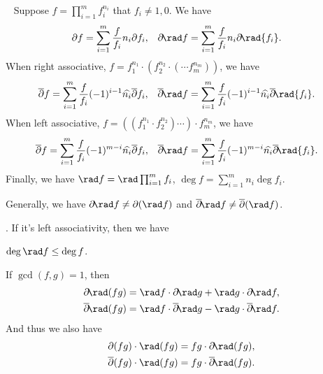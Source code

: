 \begin{proposition}~\label{prop:operator-are-separable}
	Suppose $f = \prod_{i=1}^{m}f_{i}^{n_i}$ that $f_i\ne 1, 0$.  We have
	\begin{align*}
		\partial f &= \sum_{i=1}^{m}\frac{f}{f_i}n_i\partial{f_i}, & \partial\!\rad f &= \sum_{i=1}^{m}\frac{f}{f_i}n_i\partial\!\rad{f_i}.
	\end{align*}
	When right associative, $f = f_1^{n_1}\cdot (f_2^{n_2}\cdot (\cdots f_m^{n_m}))$, we have
	\begin{align*}
		\overline{\partial}f &= \sum_{i=1}^{m}\frac{f}{f_i}(-1)^{i-1}\widehat{n_i}\overline{\partial}{f_i}, & \overline{\partial}\!\rad f  &= \sum_{i=1}^{m}\frac{f}{f_i}(-1)^{i-1}\widehat{n_i}\overline{\partial}\!\rad{f_i}.
	\end{align*}
	When left associative, $f = ((f_1^{n_1}\cdot f_2^{n_2}) \cdots) \cdot f_m^{n_m}$, we have
	\begin{align*}
		\overline{\partial}f &= \sum_{i=1}^{m}\frac{f}{f_i}(-1)^{m-i}\widehat{n_i}\overline{\partial}{f_i}, &\overline{\partial}\!\rad f  &= \sum_{i=1}^{m}\frac{f}{f_i}(-1)^{m-i}\widehat{n_i}\overline{\partial}\!\rad{f_i}.
	\end{align*}
	Finally, we have $\rad f = \rad\prod_{i=1}^{m}f_{i}$, $\deg f = \sum_{i=1}^{m}n_i\deg f_{i}$.
\end{proposition}
Generally, we have $\partial\!\rad f \ne \partial(\rad f)$ and $\overline{\partial}\!\rad f \ne \overline{\partial}(\rad f)$.
\begin{remark}. If it's left associativity, then we have
\end{remark}
\begin{proposition}
	$\deg \rad f \le \deg f$.
\end{proposition}
\begin{proposition}
	If $\gcd(f, g) = 1$, then
	\begin{align*}
		\partial\!\rad(fg) &= \rad f\cdot \partial\!\rad g + \rad g\cdot \partial\!\rad f, \\
		\overline{\partial}\!\rad(fg) &= \rad f\cdot \overline{\partial}\!\rad g - \rad g\cdot \overline{\partial}\!\rad f.
	\end{align*}
	And thus we also have
	\begin{align*}
		\partial(fg)\cdot \rad(fg) &= fg \cdot \partial\!\rad(fg), \\
		\overline{\partial}(fg)\cdot \rad(fg) &= fg \cdot \overline{\partial}\!\rad(fg).
	\end{align*}
\end{proposition}

